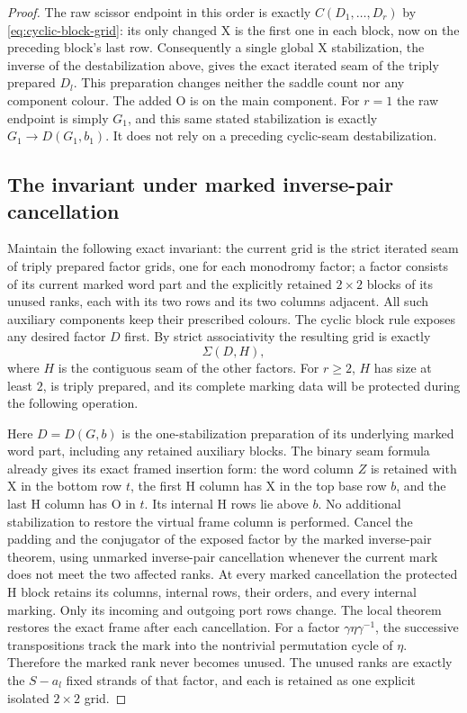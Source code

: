 \documentclass[11pt,a4paper]{article}
\theoremstyle{remark}
\begin{document}
\begin{proof}
The raw scissor endpoint in this order is exactly
$C(D_1,\ldots,D_r)$ by \eqref{eq:cyclic-block-grid}: its only changed X
is the first one in each block, now on the preceding block's last
row.  Consequently a single global X stabilization, the inverse of
the destabilization above, gives the exact iterated seam of the
triply prepared $D_l$.  This preparation changes neither the saddle
count nor any component colour.  The added O is on the main component.
For $r=1$ the raw endpoint is simply $G_1$, and this same stated
stabilization is exactly $G_1\to D(G_1,b_1)$.  It does not rely on a
preceding cyclic-seam destabilization.

\subsection{The invariant under marked inverse-pair cancellation}

Maintain the following exact invariant: the current grid is the
strict iterated seam of triply prepared factor grids, one for each
monodromy factor; a factor consists of its current marked word part
and the explicitly retained $2\times2$ blocks of its unused ranks,
each with its two rows and its two columns adjacent.
All such auxiliary components keep their prescribed colours.  The
cyclic block rule exposes any desired factor $D$ first.  By strict
associativity the resulting grid is exactly
\[
 \Sigma(D,H),
\]
where $H$ is the contiguous seam of the other factors.  For $r\geq2$,
$H$ has size at least $2$, is triply prepared, and its complete
marking data will be protected during the following operation.

Here $D=D(G,b)$ is the one-stabilization preparation of its underlying
marked word part, including any retained auxiliary blocks.  The binary
seam formula already gives its exact framed insertion form: the word
column $Z$ is retained with X in the bottom row $t$, the first H
column has X in the top base row $b$, and the last H column has O in
$t$.  Its internal H rows lie above $b$.  No additional stabilization
to restore the virtual frame column is performed.  Cancel the padding and the
conjugator of the exposed factor by the marked inverse-pair theorem, using unmarked
inverse-pair cancellation whenever the current mark does not meet the
two affected ranks.  At every marked cancellation the protected H
block retains its columns, internal rows, their orders, and every
internal marking.  Only its incoming and outgoing port rows change.
The local theorem restores the exact frame after each cancellation.
For a factor $\gamma\eta\gamma^{-1}$, the successive transpositions
track the mark into the nontrivial permutation cycle of $\eta$.
Therefore the marked rank never becomes unused.  The unused ranks are
exactly the $S-a_l$ fixed strands of that factor, and each is retained
as one explicit isolated $2\times2$ grid.


\end{proof}
\end{document}
